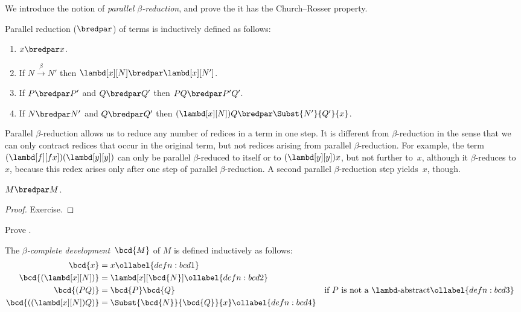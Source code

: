 \documentclass[../../../include/open-logic-section]{subfiles}
\begin{document}

We introduce the notion of \emph{parallel $\beta$-reduction}, and
prove the it has the Church--Rosser property.

\begin{defn} 
  Parallel reduction ($\bredpar$) of terms is inductively defined as follows:
  \begin{enumerate}
    \item {} $x \bredpar x$.
    \item {} If $N \xrightarrow{\beta} N'$ then $\lambd[x][N] \bredpar
      \lambd[x][N']$.
    \item {} If $P \bredpar P'$ and $Q \bredpar Q'$ then $PQ \bredpar
      P'Q'$.
    \item {} If $N \bredpar N'$ and $Q \bredpar Q'$ then
      $(\lambd[x][N])Q \bredpar \Subst{N'}{Q'}{x}$.
  \end{enumerate}
\end{defn}

Parallel $\beta$-reduction allows us to reduce any number of redices in a
term in one step. It is different from $\beta$-reduction in the sense that we
can only contract redices that occur in the original term, but not redices
arising from parallel $\beta$-reduction. For example, the term
$(\lambd[f][fx])(\lambd[y][y])$ can only be parallel $\beta$-reduced
to itself or to $(\lambd[y][y])x$, but not further to~$x$, although it
$\beta$-reduces to~$x$, because this redex arises only after one step 
of parallel $\beta$-reduction. A second parallel $\beta$-reduction
step yields~$x$, though.

\begin{thm}
  $M \bredpar M$.
\end{thm}

\begin{proof}
  Exercise.
\end{proof}

\begin{prob}
  Prove .
\end{prob}

\begin{defn}
  The \emph{$\beta$-complete development}~$\bcd{M}$ of $M$ is defined
  inductively as follows:
  \begin{align}
    \bcd{x} &= x \ollabel{defn:bcd1} \\
    \bcd{(\lambd[x][N])} &= \lambd[x][\bcd{N}] \ollabel{defn:bcd2}\\
    \bcd{(PQ)} &= \bcd{P}\bcd{Q} && \text{if $P$ is not a $\lambd$-abstract} 
    \ollabel{defn:bcd3} \\
    \bcd{((\lambd[x][N])Q)} &= \Subst{\bcd{N}}{\bcd{Q}}{x} \ollabel{defn:bcd4}
  \end{align}
\end{defn}
\end{document}

